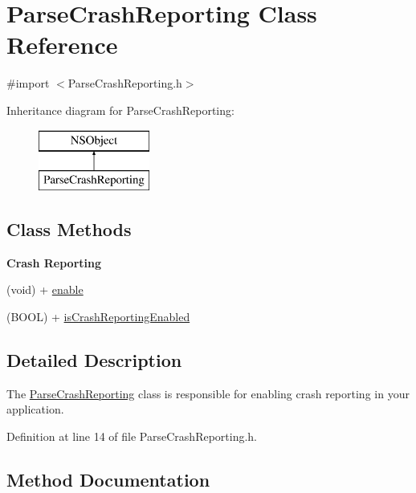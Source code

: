 \hypertarget{interface_parse_crash_reporting}{}\section{Parse\+Crash\+Reporting Class Reference}
\label{interface_parse_crash_reporting}


{\ttfamily \#import $<$Parse\+Crash\+Reporting.\+h$>$}

Inheritance diagram for Parse\+Crash\+Reporting\+:\begin{figure}[H]
\begin{center}
\leavevmode
\includegraphics[height=2.000000cm]{interface_parse_crash_reporting}
\end{center}
\end{figure}
\subsection*{Class Methods}
\begin{Indent}{\bf Crash Reporting}\par
{\em 

 

 }\begin{DoxyCompactItemize}
\item 
(void) + \hyperlink{interface_parse_crash_reporting_a5a9ec9b9f70e4032d5c29a34ee442af3}{enable}
\item 
(B\+O\+O\+L) + \hyperlink{interface_parse_crash_reporting_a29d949f034ab99619fd0d643e24b7954}{is\+Crash\+Reporting\+Enabled}
\end{DoxyCompactItemize}
\end{Indent}


\subsection{Detailed Description}
The {\ttfamily \hyperlink{interface_parse_crash_reporting}{Parse\+Crash\+Reporting}} class is responsible for enabling crash reporting in your application. 

Definition at line 14 of file Parse\+Crash\+Reporting.\+h.



\subsection{Method Documentation}
\hypertarget{interface_parse_crash_reporting_a5a9ec9b9f70e4032d5c29a34ee442af3}{}
